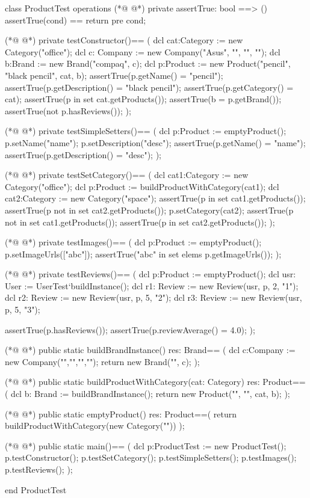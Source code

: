 \begin{vdmpp}[breaklines=true]
class ProductTest
 operations
(*@
\label{assertTrue:3}
@*)
  private assertTrue: bool ==> ()
    assertTrue(cond) == return
    pre cond;
    
(*@
\label{testConstructor:7}
@*)
  private testConstructor()==
  (
   dcl cat:Category := new Category("office");
   dcl c: Company := new Company("Asus", "", "", "");
   dcl b:Brand := new Brand("compaq", c);
   dcl p:Product := new Product("pencil", "black pencil", cat, b);
   assertTrue(p.getName() = "pencil");
   assertTrue(p.getDescription() = "black pencil");
   assertTrue(p.getCategory() = cat);
   assertTrue(p in set cat.getProducts());
   assertTrue(b = p.getBrand());
   assertTrue(not p.hasReviews());
  );
  
(*@
\label{testSimpleSetters:21}
@*)
  private testSimpleSetters()==
  (
   dcl p:Product := emptyProduct();
   p.setName("name");
   p.setDescription("desc");
   assertTrue(p.getName() = "name");
   assertTrue(p.getDescription() = "desc");
  );
  
(*@
\label{testSetCategory:30}
@*)
  private testSetCategory()==
  (
   dcl cat1:Category := new Category("office");
   dcl p:Product := buildProductWithCategory(cat1);
   dcl cat2:Category := new Category("space");
   assertTrue(p in set cat1.getProducts());
   assertTrue(p not in set cat2.getProducts());
   p.setCategory(cat2);
   assertTrue(p not in set cat1.getProducts());
   assertTrue(p in set cat2.getProducts());
  );
  
(*@
\label{testImages:42}
@*)
  private testImages()==
  (
   dcl p:Product := emptyProduct();
   p.setImageUrls(["abc"]);
   assertTrue("abc" in set elems p.getImageUrls());
  );
  
(*@
\label{testReviews:49}
@*)
  private testReviews()==
  (
   dcl p:Product := emptyProduct();
   dcl usr: User := UserTest`buildInstance();
   dcl r1: Review := new Review(usr, p, 2, "1");
   dcl r2: Review := new Review(usr, p, 5, "2");
   dcl r3: Review := new Review(usr, p, 5, "3");
   
   assertTrue(p.hasReviews());
   assertTrue(p.reviewAverage() = 4.0);
  );
  
(*@
\label{buildBrandInstance:61}
@*)
  public static buildBrandInstance() res: Brand==
  (
   dcl c:Company := new Company("","","","");
   return new Brand("", c);
  );
  
(*@
\label{buildProductWithCategory:67}
@*)
  public static buildProductWithCategory(cat: Category) res: Product==
  (
   dcl b: Brand := buildBrandInstance();
   return new Product("", "", cat, b);
  );
  
(*@
\label{emptyProduct:73}
@*)
  public static emptyProduct() res: Product==(
   return buildProductWithCategory(new Category(""))
  ); 
  
(*@
\label{main:77}
@*)
  public static main()==
    (
   dcl p:ProductTest := new ProductTest();
   p.testConstructor();
   p.testSetCategory();
   p.testSimpleSetters();
   p.testImages();
   p.testReviews();
    );
     
end ProductTest
\end{vdmpp}
